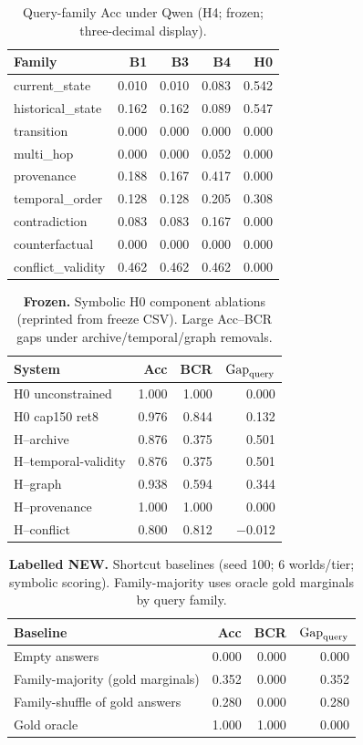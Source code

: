 \begin{table}[t]
\centering
\caption{Query-family Acc under Qwen (H4; frozen; three-decimal display).}
\label{tab:queryfam}
\scriptsize
\begin{tabular}{lrrrr}
\toprule
Family & B1 & B3 & B4 & H0 \\
\midrule
current\_state & 0.010 & 0.010 & 0.083 & 0.542 \\
historical\_state & 0.162 & 0.162 & 0.089 & 0.547 \\
transition & 0.000 & 0.000 & 0.000 & 0.000 \\
multi\_hop & 0.000 & 0.000 & 0.052 & 0.000 \\
provenance & 0.188 & 0.167 & 0.417 & 0.000 \\
temporal\_order & 0.128 & 0.128 & 0.205 & 0.308 \\
contradiction & 0.083 & 0.083 & 0.167 & 0.000 \\
counterfactual & 0.000 & 0.000 & 0.000 & 0.000 \\
conflict\_validity & 0.462 & 0.462 & 0.462 & 0.000 \\
\bottomrule
\end{tabular}
\end{table}

\begin{table}[t]
\centering
\caption{\textbf{Frozen.} Symbolic H0 component ablations (reprinted from freeze CSV). Large Acc--BCR gaps under archive/temporal/graph removals.}
\label{tab:ablations}
\small
\begin{tabular}{lrrr}
\toprule
System & Acc & BCR & $\mathrm{Gap}_{\mathrm{query}}$ \\
\midrule
H0 unconstrained & 1.000 & 1.000 & 0.000 \\
H0 cap150 ret8 & 0.976 & 0.844 & 0.132 \\
H--archive & 0.876 & 0.375 & 0.501 \\
H--temporal-validity & 0.876 & 0.375 & 0.501 \\
H--graph & 0.938 & 0.594 & 0.344 \\
H--provenance & 1.000 & 1.000 & 0.000 \\
H--conflict & 0.800 & 0.812 & $-$0.012 \\
\bottomrule
\end{tabular}
\end{table}

\begin{table}[t]
\centering
\caption{\textbf{Labelled NEW.} Shortcut baselines (seed 100; 6 worlds/tier; symbolic scoring). Family-majority uses oracle gold marginals by query family.}
\label{tab:shortcuts}
\small
\begin{tabular}{lrrr}
\toprule
Baseline & Acc & BCR & $\mathrm{Gap}_{\mathrm{query}}$ \\
\midrule
Empty answers & 0.000 & 0.000 & 0.000 \\
Family-majority (gold marginals) & 0.352 & 0.000 & 0.352 \\
Family-shuffle of gold answers & 0.280 & 0.000 & 0.280 \\
Gold oracle & 1.000 & 1.000 & 0.000 \\
\bottomrule
\end{tabular}
\end{table}

